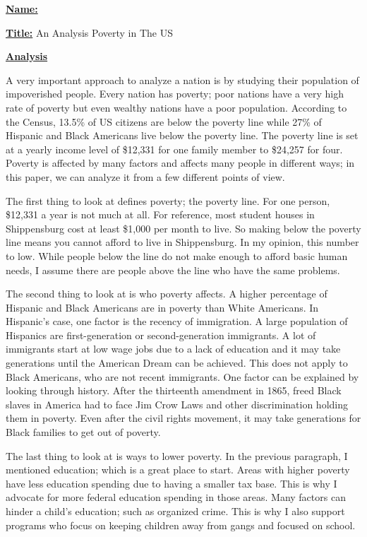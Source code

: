 \documentclass{article}
\author{Ryan Bruno}
\date{\today}
\renewcommand{\maketitle}{
\textbf{\underline{Name:}}
\theauthor

\textbf{\underline{Title:}}
An Analysis Poverty in The US
}
\begin{document}
\maketitle

\textbf{\underline{Analysis}}

\setlength{\parindent}{10ex}
A very important approach to analyze a nation is by studying their population of impoverished people. Every nation has poverty; poor nations have a very high rate of poverty but even wealthy nations have a poor population. According to the Census, 13.5\% of US citizens are below the poverty line while 27\% of Hispanic and Black Americans live below the poverty line. The poverty line is set at a yearly income level of \$12,331 for one family member to \$24,257 for four. Poverty is affected by many factors and affects many people in different ways; in this paper, we can analyze it from a few different points of view.

The first thing to look at defines poverty; the poverty line. For one person, \$12,331 a year is not much at all. For reference, most student houses in Shippensburg cost at least \$1,000 per month to live. So making below the poverty line means you cannot afford to live in Shippensburg. In my opinion, this number to low. While people below the line do not make enough to afford basic human needs, I assume there are people above the line who have the same problems.

The second thing to look at is who poverty affects. A higher percentage of Hispanic and Black Americans are in poverty than White Americans. In Hispanic's case, one factor is the recency of immigration. A large population of Hispanics are first-generation or second-generation immigrants. A lot of immigrants start at low wage jobs due to a lack of education and it may take generations until the American Dream can be achieved. This does not apply to Black Americans, who are not recent immigrants. One factor can be explained by looking through history. After the thirteenth amendment in 1865, freed Black slaves in America had to face Jim Crow Laws and other discrimination holding them in poverty. Even after the civil rights movement, it may take generations for Black families to get out of poverty.

The last thing to look at is ways to lower poverty. In the previous paragraph, I mentioned education; which is a great place to start. Areas with higher poverty have less education spending due to having a smaller tax base. This is why I advocate for more federal education spending in those areas. Many factors can hinder a child's education; such as organized crime. This is why I also support programs who focus on keeping children away from gangs and focused on school.
\end{document}
